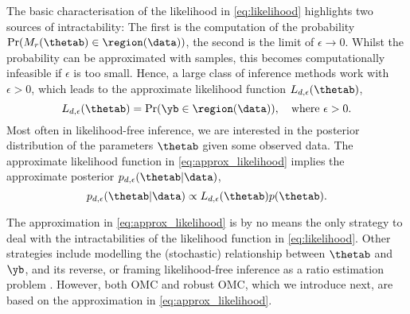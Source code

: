 The basic characterisation of the likelihood in \eqref{eq:likelihood}
highlights two sources of intractability: The first is the computation
of the probability $\Pr(M_r(\thetab) \in \region(\data))$, the second
is the limit of $\epsilon \to 0$.  Whilst the probability can be
approximated with samples, this becomes computationally infeasible if
$\epsilon$ is too small. Hence, a large class of inference methods
work with $\epsilon >0$, which leads to the approximate likelihood
function $L_{d, \epsilon}(\thetab)$,
\begin{equation} \label{eq:approx_likelihood}
  L_{d, \epsilon}(\thetab) = \Pr(\yb \in \region(\data)), \quad \text{where  } \epsilon > 0.
\end{equation}
Most often in likelihood-free inference, we are interested in the posterior distribution of the parameters $\thetab$ given some observed data. The approximate likelihood function in \eqref{eq:approx_likelihood} implies the approximate posterior  $p_{d,\epsilon}(\thetab|\data)$, 
\begin{equation} \label{eq:approx_posterior}
  p_{d,\epsilon}(\thetab|\data) \propto L_{d, \epsilon}(\thetab) p(\thetab).
\end{equation}

The approximation in \eqref{eq:approx_likelihood} is by no means the
only strategy to deal with the intractabilities of the likelihood
function in \eqref{eq:likelihood}. Other strategies include modelling
the (stochastic) relationship between $\thetab$ and $\yb$, and its
reverse, or framing likelihood-free inference as a ratio estimation
problem \citep[see e.g.\ ][]{Blum2010, Wood2010, Papamakarios2016,
Thomas2016, Papamakarios2019, Chen2019, Thomas2020, Hermans2020}. However, both OMC and robust OMC, which we introduce next,
are based on the approximation in \eqref{eq:approx_likelihood}.





